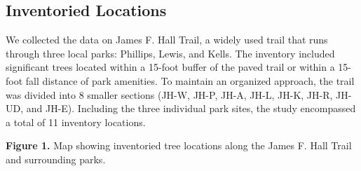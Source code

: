 \documentclass[
  letterpaper,
  DIV=11,
  numbers=noendperiod]{scrartcl}
\begin{document}
\subsection{Inventoried Locations}\label{inventoried-locations}

We collected the data on James F. Hall Trail, a widely used trail that
runs through three local parks: Phillips, Lewis, and Kells. The
inventory included significant trees located within a 15-foot buffer of
the paved trail or within a 15-foot fall distance of park amenities. To
maintain an organized approach, the trail was divided into 8 smaller
sections (JH-W, JH-P, JH-A, JH-L, JH-K, JH-R, JH-UD, and JH-E).
Including the three individual park sites, the study encompassed a total
of 11 inventory locations.

\textbf{Figure 1.} Map showing inventoried tree locations along the
James F. Hall Trail and surrounding parks.
\end{document}
